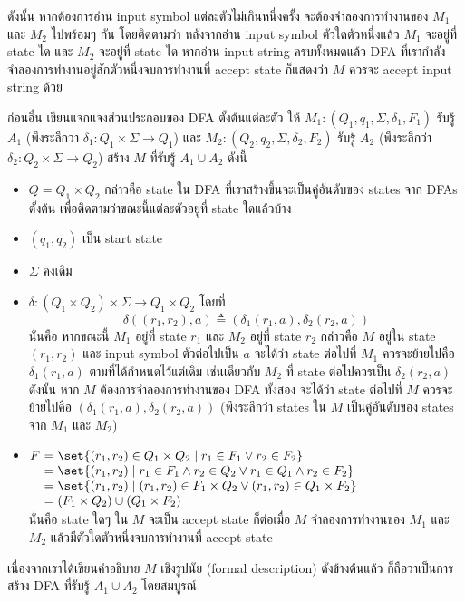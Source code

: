 \begin{theorem}
ดังนั้น หากต้องการอ่าน input symbol แต่ละตัวไม่เกินหนึ่งครั้ง จะต้องจำลองการทำงานของ $M_1$ และ $M_2$ ไปพร้อมๆ กัน โดยติดตามว่า หลังจากอ่าน input symbol ตัวใดตัวหนึ่งแล้ว $M_1$ จะอยู่ที่ state ใด และ $M_2$ จะอยู่ที่ state ใด \enskip หากอ่าน input string ครบทั้งหมดแล้ว DFA ที่เรากำลังจำลองการทำงานอยู่สักตัวหนึ่งจบการทำงานที่ accept state ก็แสดงว่า $M$ ควรจะ accept input string ด้วย
\begin{pf}
ก่อนอื่น เขียนแจกแจงส่วนประกอบของ DFA ตั้งต้นแต่ละตัว \enskip ให้ $M_1:(Q_1,q_1,\Sigma,\delta_1,F_1)$ รับรู้ $A_1$ (พึงระลึกว่า $\delta_1:Q_1\times\Sigma\to Q_1$) และ $M_2:(Q_2,q_2,\Sigma,\delta_2,F_2)$ รับรู้ $A_2$ (พึงระลึกว่า $\delta_2:Q_2\times\Sigma\to Q_2$) \enskip สร้าง $M$ ที่รับรู้ $A_1\cup A_2$ ดังนี้
\begin{itemize}
\item $Q=Q_1\times Q_2$ กล่าวคือ state ใน DFA ที่เราสร้างขึ้นจะเป็นคู่อันดับของ states จาก DFAs ตั้งต้น เพื่อติดตามว่าขณะนี้แต่ละตัวอยู่ที่ state ใดแล้วบ้าง
\item $(q_1,q_2)$ เป็น start state
\item $\Sigma$ คงเดิม
\item $\delta:(Q_1\times Q_2)\times\Sigma\to Q_1\times Q_2$ โดยที่ \[\delta((r_1,r_2),a)\triangleq(\delta_1(r_1,a),\delta_2(r_2,a))\]
นั่นคือ หากขณะนี้ $M_1$ อยู่ที่ state $r_1$ และ $M_2$ อยู่ที่ state $r_2$ กล่าวคือ $M$ อยู่ใน state $(r_1,r_2)$ และ input symbol ตัวต่อไปเป็น $a$ จะได้ว่า state ต่อไปที่ $M_1$ ควรจะย้ายไปคือ $\delta_1(r_1,a)$ ตามที่ได้กำหนดไว้แต่เดิม \enskip เช่นเดียวกับ $M_2$ ที่ state ต่อไปควรเป็น $\delta_2(r_2,a)$ \enskip ดังนั้น หาก $M$ ต้องการจำลองการทำงานของ DFA ทั้งสอง จะได้ว่า state ต่อไปที่ $M$ ควรจะย้ายไปคือ $(\delta_1(r_1,a),\delta_2(r_2,a))$ (พึงระลึกว่า states ใน $M$ เป็นคู่อันดับของ states จาก $M_1$ และ $M_2$)
\item
$
\begin{array}[t]{@{}r@{\ }l}
F
&=\set{(r_1,r_2)\in Q_1\times Q_2\mid r_1\in F_1\vee r_2\in F_2} \\
&=\set{(r_1,r_2)\mid r_1\in F_1\wedge r_2\in Q_2\vee r_1\in Q_1\wedge r_2\in F_2} \\
&=\set{(r_1,r_2)\mid (r_1,r_2)\in F_1\times Q_2\vee (r_1,r_2)\in Q_1\times F_2} \\
&=(F_1\times Q_2)\cup(Q_1\times F_2)
\end{array}
$
\\
นั่นคือ state ใดๆ ใน $M$ จะเป็น accept state ก็ต่อเมื่อ $M$ จำลองการทำงานของ $M_1$ และ $M_2$ แล้วมีตัวใดตัวหนึ่งจบการทำงานที่ accept state
\end{itemize}
เนื่องจากเราได้เขียนคำอธิบาย $M$ เชิงรูปนัย (formal description) ดังข้างต้นแล้ว ก็ถือว่าเป็นการสร้าง DFA ที่รับรู้ $A_1\cup A_2$ โดยสมบูรณ์
\end{pf}
\end{theorem}

